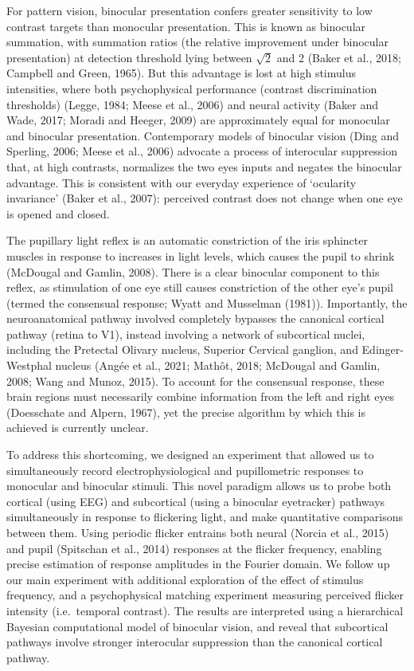 \documentclass[
]{article}
\begin{document}
For pattern vision, binocular presentation confers greater sensitivity to low contrast targets than monocular presentation. This is known as binocular summation, with summation ratios (the relative improvement under binocular presentation) at detection threshold lying between \(\sqrt{2}\) and 2 (Baker et al., 2018; Campbell and Green, 1965). But this advantage is lost at high stimulus intensities, where both psychophysical performance (contrast discrimination thresholds) (Legge, 1984; Meese et al., 2006) and neural activity (Baker and Wade, 2017; Moradi and Heeger, 2009) are approximately equal for monocular and binocular presentation. Contemporary models of binocular vision (Ding and Sperling, 2006; Meese et al., 2006) advocate a process of interocular suppression that, at high contrasts, normalizes the two eyes inputs and negates the binocular advantage. This is consistent with our everyday experience of `ocularity invariance' (Baker et al., 2007): perceived contrast does not change when one eye is opened and closed.

The pupillary light reflex is an automatic constriction of the iris sphincter muscles in response to increases in light levels, which causes the pupil to shrink (McDougal and Gamlin, 2008). There is a clear binocular component to this reflex, as stimulation of one eye still causes constriction of the other eye's pupil (termed the consensual response; Wyatt and Musselman (1981)). Importantly, the neuroanatomical pathway involved completely bypasses the canonical cortical pathway (retina to V1), instead involving a network of subcortical nuclei, including the Pretectal Olivary nucleus, Superior Cervical ganglion, and Edinger-Westphal nucleus (Angée et al., 2021; Mathôt, 2018; McDougal and Gamlin, 2008; Wang and Munoz, 2015). To account for the consensual response, these brain regions must necessarily combine information from the left and right eyes (Doesschate and Alpern, 1967), yet the precise algorithm by which this is achieved is currently unclear.

To address this shortcoming, we designed an experiment that allowed us to simultaneously record electrophysiological and pupillometric responses to monocular and binocular stimuli. This novel paradigm allows us to probe both cortical (using EEG) and subcortical (using a binocular eyetracker) pathways simultaneously in response to flickering light, and make quantitative comparisons between them. Using periodic flicker entrains both neural (Norcia et al., 2015) and pupil (Spitschan et al., 2014) responses at the flicker frequency, enabling precise estimation of response amplitudes in the Fourier domain. We follow up our main experiment with additional exploration of the effect of stimulus frequency, and a psychophysical matching experiment measuring perceived flicker intensity (i.e.~temporal contrast). The results are interpreted using a hierarchical Bayesian computational model of binocular vision, and reveal that subcortical pathways involve stronger interocular suppression than the canonical cortical pathway.
\end{document}
